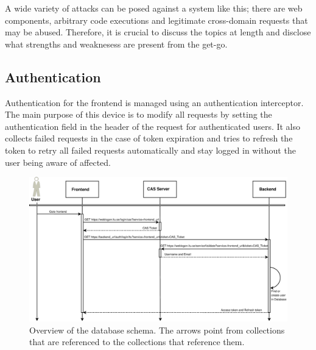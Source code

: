 A wide variety of attacks can be posed against a system like this; there are web components, arbitrary code executions and legitimate cross-domain requests that may be abused. Therefore, it is crucial to discuss the topics at length and disclose what strengths and weaknesess are present from the get-go.

\subsection{Authentication}
Authentication for the frontend is managed using an authentication interceptor. The main purpose of this device is to modify all requests by setting the authentication field in the header of the request for authenticated users. It also collects failed requests in the case of token expiration and tries to refresh the token to retry all failed requests automatically and stay logged in without the user being aware of affected.
\begin{figure}
    \centering
    \includegraphics[width=\textwidth]{img/authentication_sequence.eps}
    \caption{Overview of the database schema. The arrows point from collections that are referenced to the collections that reference them.}
    \label{fig:schema}
\end{figure}

